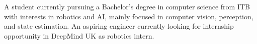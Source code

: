 

\begin{cvparagraph}
A student currently pursuing a Bachelor's degree in computer science from ITB with interests in robotics and AI, mainly focused in computer vision, perception, and state estimation. An aspiring engineer currently looking for internship opportunity in DeepMind UK as robotics intern.
\end{cvparagraph}
